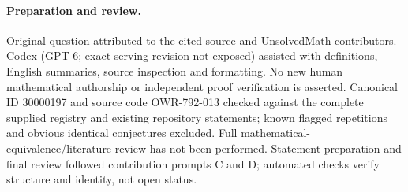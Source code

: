 \documentclass[11pt]{article}
\begin{document}
\paragraph{Preparation and review.}
Original question attributed to the cited source and UnsolvedMath contributors. Codex (GPT-6; exact serving revision not exposed) assisted with definitions, English summaries, source inspection and formatting. No new human mathematical authorship or independent proof verification is asserted. Canonical ID 30000197 and source code OWR-792-013 checked against the complete supplied registry and existing repository statements; known flagged repetitions and obvious identical conjectures excluded. Full mathematical-equivalence/literature review has not been performed. Statement preparation and final review followed contribution prompts C and D; automated checks verify structure and identity, not open status.
\label{end:30000197}
\end{document}

